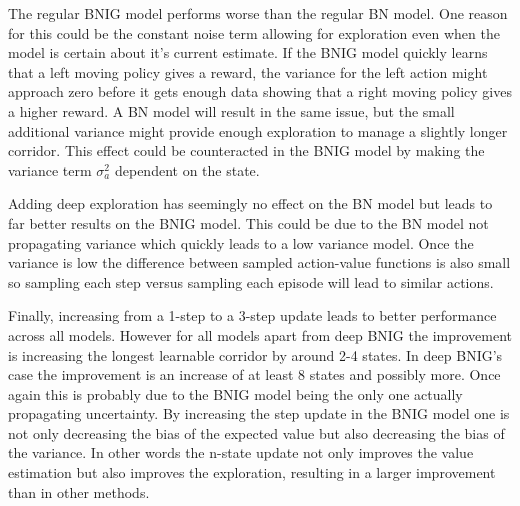 The regular BNIG model performs worse than the regular BN model. One reason for this could be the constant noise term allowing for exploration even when the model is certain about it's current estimate. If the BNIG model quickly learns that a left moving policy gives a reward, the variance for the left action might approach zero before it gets enough data showing that a right moving policy gives a higher reward. A BN model will result in the same issue, but the small additional variance might provide enough exploration to manage a slightly longer corridor. This effect could be counteracted in the BNIG model by making the variance term $\sigma_a^2$ dependent on the state.

Adding deep exploration has seemingly no effect on the BN model but leads to far better results on the BNIG model. This could be due to the BN model not propagating variance which quickly leads to a low variance model. Once the variance is low the difference between sampled action-value functions is also small so sampling each step versus sampling each episode will lead to similar actions.

Finally, increasing from a 1-step to a 3-step update leads to better performance across all models. However for all models apart from deep BNIG the improvement is increasing the longest learnable corridor by around 2-4 states. In deep BNIG's case the improvement is an increase of at least 8 states and possibly more. Once again this is probably due to the BNIG model being the only one actually propagating uncertainty. By increasing the step update in the BNIG model one is not only decreasing the bias of the expected value but also decreasing the bias of the variance. In other words the n-state update not only improves the value estimation but also improves the exploration, resulting in a larger improvement than in other methods.




